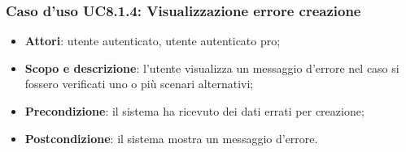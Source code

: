 	\subsubsection{Caso d'uso UC8.1.4: Visualizzazione errore creazione}
	\begin{itemize}
		\item
			\textbf{Attori}: utente autenticato, utente autenticato pro;
		\item
			\textbf{Scopo e descrizione}: l'utente visualizza un messaggio d'errore nel caso si fossero verificati uno o più scenari alternativi;
		\item		
			\textbf{Precondizione}: il sistema ha ricevuto dei dati errati per creazione;
		\item
			\textbf{Postcondizione}: il sistema mostra un messaggio d'errore.
	\end{itemize}	
